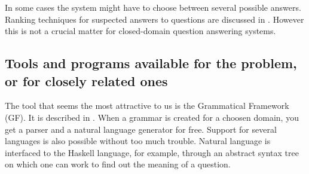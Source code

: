 \documentclass[a4paper,11pt]{article}
\begin{document}
In some cases the system might have to choose between several possible answers.
Ranking techniques for suspected answers to questions are discussed in
\cite{rankingsuspected}. However this is not a crucial matter for closed-domain
question answering systems.

\subsection{Tools and programs available for the problem, or for closely related ones}
The tool that seems the most attractive to us is the Grammatical Framework (GF). It
is described in \cite{ranta-2011}. When a grammar is created for a choosen domain,
you get a parser and a natural language generator for free. Support for several
languages is also possible without too much trouble. Natural language is interfaced to the
Haskell language, for example, through an abstract syntax tree on which one can work
to find out the meaning of a question.




\end{document}
